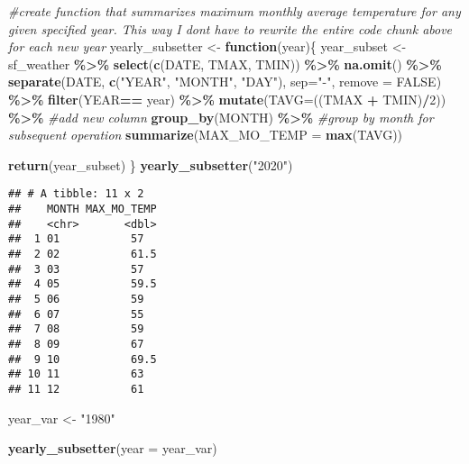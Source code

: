 \documentclass[
]{article}
\newenvironment{Shaded}{\begin{snugshade}}{\end{snugshade}}
\newcommand{\AttributeTok}[1]{\textcolor[rgb]{0.13,0.29,0.53}{#1}}
\newcommand{\CommentTok}[1]{\textcolor[rgb]{0.56,0.35,0.01}{\textit{#1}}}
\newcommand{\ConstantTok}[1]{\textcolor[rgb]{0.56,0.35,0.01}{#1}}
\newcommand{\ControlFlowTok}[1]{\textcolor[rgb]{0.13,0.29,0.53}{\textbf{#1}}}
\newcommand{\DecValTok}[1]{\textcolor[rgb]{0.00,0.00,0.81}{#1}}
\newcommand{\FunctionTok}[1]{\textcolor[rgb]{0.13,0.29,0.53}{\textbf{#1}}}
\newcommand{\NormalTok}[1]{#1}
\newcommand{\OtherTok}[1]{\textcolor[rgb]{0.56,0.35,0.01}{#1}}
\newcommand{\SpecialCharTok}[1]{\textcolor[rgb]{0.81,0.36,0.00}{\textbf{#1}}}
\newcommand{\StringTok}[1]{\textcolor[rgb]{0.31,0.60,0.02}{#1}}
\begin{document}
\begin{Shaded}
\begin{Highlighting}[]
\CommentTok{\#create function that summarizes maximum monthly average temperature for any given specified year. This way I don\textquotesingle{}t have to rewrite the entire code chunk above for each new year}
\NormalTok{yearly\_subsetter }\OtherTok{\textless{}{-}} \ControlFlowTok{function}\NormalTok{(year)\{}
\NormalTok{  year\_subset }\OtherTok{\textless{}{-}}\NormalTok{ sf\_weather }\SpecialCharTok{\%\textgreater{}\%} 
    \FunctionTok{select}\NormalTok{(}\FunctionTok{c}\NormalTok{(DATE, TMAX, TMIN)) }\SpecialCharTok{\%\textgreater{}\%} 
    \FunctionTok{na.omit}\NormalTok{() }\SpecialCharTok{\%\textgreater{}\%} 
    \FunctionTok{separate}\NormalTok{(DATE, }\FunctionTok{c}\NormalTok{(}\StringTok{"YEAR"}\NormalTok{, }\StringTok{"MONTH"}\NormalTok{, }\StringTok{"DAY"}\NormalTok{), }\AttributeTok{sep=}\StringTok{"{-}"}\NormalTok{, }\AttributeTok{remove =} \ConstantTok{FALSE}\NormalTok{) }\SpecialCharTok{\%\textgreater{}\%} 
    \FunctionTok{filter}\NormalTok{(YEAR}\SpecialCharTok{==}\NormalTok{ year) }\SpecialCharTok{\%\textgreater{}\%} 
    \FunctionTok{mutate}\NormalTok{(}\AttributeTok{TAVG=}\NormalTok{((TMAX }\SpecialCharTok{+}\NormalTok{ TMIN)}\SpecialCharTok{/}\DecValTok{2}\NormalTok{)) }\SpecialCharTok{\%\textgreater{}\%} \CommentTok{\#add new column }
    \FunctionTok{group\_by}\NormalTok{(MONTH) }\SpecialCharTok{\%\textgreater{}\%} \CommentTok{\#group by month for subsequent operation}
    \FunctionTok{summarize}\NormalTok{(}\AttributeTok{MAX\_MO\_TEMP =} \FunctionTok{max}\NormalTok{(TAVG))}
  
  \FunctionTok{return}\NormalTok{(year\_subset)}
\NormalTok{\}}
 \FunctionTok{yearly\_subsetter}\NormalTok{(}\StringTok{"2020"}\NormalTok{)}
\end{Highlighting}
\end{Shaded}

\begin{verbatim}
## # A tibble: 11 x 2
##    MONTH MAX_MO_TEMP
##    <chr>       <dbl>
##  1 01           57  
##  2 02           61.5
##  3 03           57  
##  4 05           59.5
##  5 06           59  
##  6 07           55  
##  7 08           59  
##  8 09           67  
##  9 10           69.5
## 10 11           63  
## 11 12           61
\end{verbatim}

\begin{Shaded}
\begin{Highlighting}[]
\NormalTok{year\_var }\OtherTok{\textless{}{-}} \StringTok{"1980"}

\FunctionTok{yearly\_subsetter}\NormalTok{(}\AttributeTok{year =}\NormalTok{ year\_var)}
\end{Highlighting}
\end{Shaded}
\end{document}
